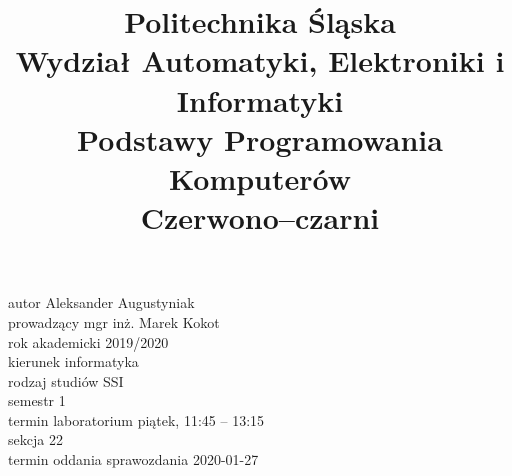 
\usepackage[margin=1in]{geometry}
\usepackage{polski}
\usepackage{ragged2e}
\usepackage[utf8]{inputenc} 
\usepackage{graphicx}



\title{\LARGE{Politechnika Śląska\\
		Wydział Automatyki, Elektroniki i Informatyki\\}
		\LARGE{\textbf{Podstawy Programowania Komputerów}\\}
		\textbf{Czerwono–czarni}
}
\date{}



	\begin{center}

	
\rmfamily
	\end{center}

		autor Aleksander Augustyniak					\\
		prowadzący mgr inż. Marek Kokot				\\
		rok akademicki 2019/2020						\\
		kierunek informatyka								\\
		rodzaj studiów SSI									\\
		semestr 1											\\
		termin laboratorium piątek, 11:45 – 13:15		\\
		sekcja 22												\\
		termin oddania sprawozdania 2020-01-27		\\



